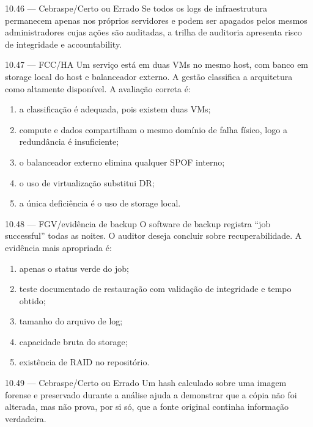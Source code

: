\begin{questao}{ 10.46 — Cebraspe/Certo ou Errado}
Se todos os logs de infraestrutura permanecem apenas nos próprios servidores e podem ser apagados pelos mesmos administradores cujas ações são auditadas, a trilha de auditoria apresenta risco de integridade e accountability.
\end{questao}

\begin{questao}{ 10.47 — FCC/HA}
Um serviço está em duas VMs no mesmo host, com banco em storage local do host e balanceador externo. A gestão classifica a arquitetura como altamente disponível. A avaliação correta é:
\begin{enumerate}[label=\Alph*)]
\item a classificação é adequada, pois existem duas VMs;
\item compute e dados compartilham o mesmo domínio de falha físico, logo a redundância é insuficiente;
\item o balanceador externo elimina qualquer SPOF interno;
\item o uso de virtualização substitui DR;
\item a única deficiência é o uso de storage local.
\end{enumerate}
\end{questao}

\begin{questao}{ 10.48 — FGV/evidência de backup}
O software de backup registra ``job successful'' todas as noites. O auditor deseja concluir sobre recuperabilidade. A evidência mais apropriada é:
\begin{enumerate}[label=\Alph*)]
\item apenas o status verde do job;
\item teste documentado de restauração com validação de integridade e tempo obtido;
\item tamanho do arquivo de log;
\item capacidade bruta do storage;
\item existência de RAID no repositório.
\end{enumerate}
\end{questao}

\begin{questao}{ 10.49 — Cebraspe/Certo ou Errado}
Um hash calculado sobre uma imagem forense e preservado durante a análise ajuda a demonstrar que a cópia não foi alterada, mas não prova, por si só, que a fonte original continha informação verdadeira.
\end{questao}

